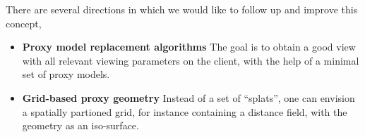 There are several directions in which we would like to follow up and improve
this concept,
\begin{itemize}
\item \textbf{Proxy model replacement algorithms} The goal is to obtain a good view with
all relevant viewing parameters on the client, with the help of a minimal set of
proxy models.
\item \textbf{Grid-based proxy geometry} Instead of a set of ``splats'', one can
envision a spatially partioned grid, for instance containing a distance field,
with the geometry as an iso-surface.
\end{itemize}





%






